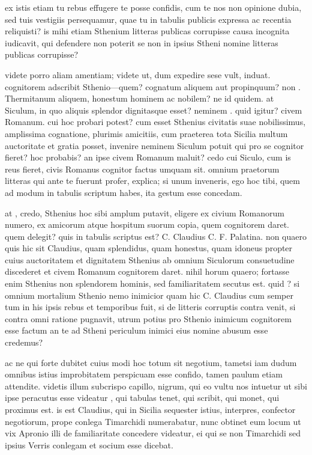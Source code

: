  ex istis etiam tu rebus effugere te posse confidis, cum te nos non opinione dubia, sed tuis vestigiis persequamur, quae tu in tabulis publicis expressa ac recentia reliquisti? is mihi etiam Sthenium litteras publicas corrupisse causa incognita iudicavit, qui defendere non poterit se non in ipsius Stheni nomine litteras publicas corrupisse?

 videte porro aliam amentiam; videte ut, dum expedire sese vult, induat. cognitorem adscribit Sthenio—quem? cognatum aliquem aut propinquum? non . Thermitanum aliquem, honestum hominem ac nobilem? ne id quidem. at Siculum, in quo aliquis splendor dignitasque esset? neminem . quid igitur? civem Romanum. cui hoc probari potest? cum esset Sthenius civitatis suae nobilissimus, amplissima cognatione, plurimis amicitiis, cum praeterea tota Sicilia multum auctoritate et gratia posset, invenire neminem Siculum potuit qui pro se cognitor fieret? hoc probabis? an ipse civem Romanum maluit? cedo cui Siculo, cum is reus fieret, civis Romanus cognitor factus umquam sit. omnium praetorum litteras qui ante te fuerunt profer, explica; si unum inveneris, ego hoc tibi, quem ad modum in tabulis scriptum habes, ita gestum esse concedam.

 at , credo, Sthenius hoc sibi amplum putavit, eligere ex civium Romanorum numero, ex amicorum atque hospitum suorum copia, quem cognitorem daret. quem delegit? quis in tabulis scriptus est? C. Claudius C. F. Palatina. non quaero quis hic sit Claudius, quam splendidus, quam honestus, quam idoneus propter cuius auctoritatem et dignitatem Sthenius ab omnium Siculorum consuetudine discederet et civem Romanum cognitorem daret. nihil horum quaero; fortasse enim Sthenius non splendorem hominis, sed familiaritatem secutus est. quid ? si omnium mortalium Sthenio nemo inimicior quam hic C. Claudius cum semper tum in his ipsis rebus et temporibus fuit, si de litteris corruptis contra venit, si contra omni ratione pugnavit, utrum potius pro Sthenio inimicum cognitorem esse factum an te ad Stheni periculum inimici eius nomine abusum esse credemus?

 ac ne qui forte dubitet cuius modi hoc totum sit negotium, tametsi iam dudum omnibus istius improbitatem perspicuam esse confido, tamen paulum etiam attendite. videtis illum subcrispo capillo, nigrum, qui eo vultu nos intuetur ut sibi ipse peracutus esse videatur , qui tabulas tenet, qui scribit, qui monet, qui proximus est. is est Claudius, qui in Sicilia sequester istius, interpres, confector negotiorum, prope conlega Timarchidi numerabatur, nunc obtinet eum locum ut vix Apronio illi de familiaritate concedere videatur, ei qui se non Timarchidi sed ipsius Verris conlegam et socium esse dicebat.

